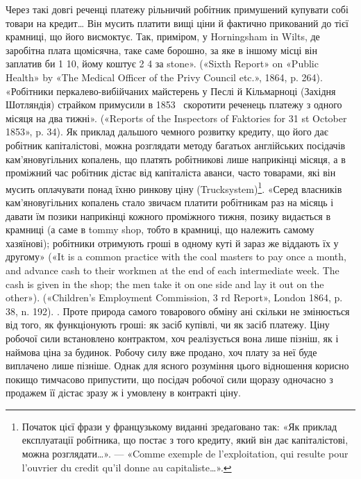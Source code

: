 {Через такі довгі реченці платежу рільничий робітник примушений купувати
собі товари на кредит\dots{} Він мусить платити вищі ціни й фактично
прикований до тієї крамниці, що його висмоктує. Так, приміром, у Horningsham
in Wilts, де заробітна плата щомісячна, таке саме борошно, за
яке в іншому місці він заплатив би 1 10, йому коштує 2
4 за stone». («Sixth Report» on «Public Health» by «The
Medical Officer of the Privy Council etc.», 1864, p. 264). «Робітники перкалево-вибійчаних
майстерень у Песлі й Кільмарноці (Західня Шотляндія)
страйком примусили в 1853~ скоротити реченець платежу з одного
місяця на два тижні». («Reports of the Inspectors of Faktories for 31 st
October 1853», p. 34). Як приклад дальшого чемного розвитку кредиту,
що його дає робітник капіталістові, можна розглядати методу багатьох
англійських посідачів кам’яновугільних копалень, що платять робітникові
лише наприкінці місяця, а в проміжний час робітник дістає від капіталіста
аванси, часто товарами, які він мусить оплачувати понад їхню
ринкову ціну (Trucksystem)\footnote*{
Початок цієї фрази у французькому виданні зредаґовано так: «Як
приклад експлуатації робітника, що постає з того кредиту, який він дає
капіталістові, можна розглядати\dots{}». — «Comme exemple de l’exploitation,
qui resulte pour l’ouvrier du credit qu’il donne au capitaliste\dots{}». \Red{}
}.
«Серед власників кам’яновугільних копалень
стало звичаєм платити робітникам раз на місяць і давати їм позики
наприкінці кожного проміжного тижня, позику видається в крамниці
(а саме в tommy shop, тобто в крамниці, що належить самому хазяїнові);
робітники отримують гроші в одному куті й зараз же віддають їх у другому»
(«It is a common practice with the coal masters to pay once a month,
and advance cash to their workmen at the end of each intermediate week.
The cash is given in the shop; the men take it on one side and lay it out on
the other»). («Children’s Employment Commission, 3 rd Report», London
1864, p. 38, n. 192).
}.
Проте природа самого товарового
обміну ані скільки не змінюється від того, як функціонують
гроші: як засіб купівлі, чи як засіб платежу. Ціну робочої сили
встановлено контрактом, хоч реалізується вона лише пізніш,
як і наймова ціна за будинок. Робочу силу вже продано, хоч
плату за неї буде виплачено лише пізніше. Однак для ясного розуміння
цього відношення корисно покищо тимчасово припустити,
що посідач робочої сили щоразу одночасно з продажем її дістає
зразу ж і умовлену в контракті ціну.

